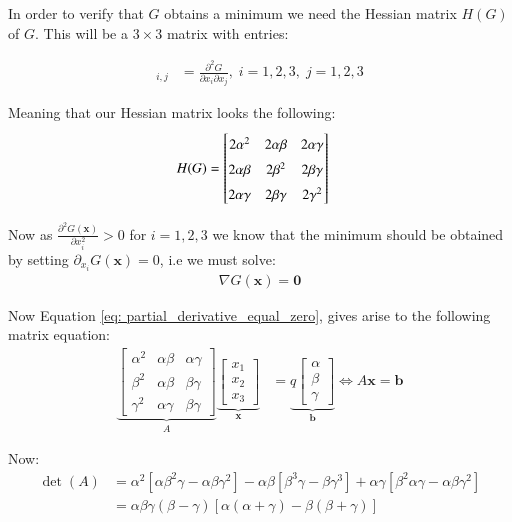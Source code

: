 In order to verify that $G$ obtains a minimum we need the Hessian matrix $H(G)$ of $G$. This will be a $3\times 3$ matrix with entries:  

\begin{align*}
[H(G)]_{i,j} &= 
\frac{
\partial^{2}G
}{
\partial x_{i}\partial x_{j}
}, \; i=1,2,3,\;j=1,2,3
\end{align*}

Meaning that our Hessian matrix looks the following:
\begin{align*}
H(G) &= 
\begingroup
\renewcommand*{\arraystretch}{1.5}
\begin{bmatrix}
2\alpha^{2} & 
2\alpha \beta & 
2\alpha \gamma \\ 
2\alpha \beta &
2\beta^{2} &
2\beta \gamma \\
2\alpha \gamma &
2\beta \gamma & 
2\gamma^{2}
\end{bmatrix}
\endgroup
\end{align*}


Now as $\frac{\partial^{2}G(\mathbf{x}) }{\partial x_{i}^{2}} > 0$ for $i=1,2,3$ we know that the minimum should be obtained by setting $\partial_{x_{i}}G(\mathbf{x}) = 0$, i.e we must solve: 
\begin{align}
\label{eq: partial_derivative_equal_zero}
\nabla G(\mathbf{x}) = \mathbf{0}    
\end{align}

Now Equation \ref{eq: partial_derivative_equal_zero}, gives arise to the following matrix equation: 
\begin{align*}
\underbrace{
\begin{bmatrix}
\alpha^{2} & \alpha\beta & \alpha\gamma \\ 
\beta^{2} & \alpha\beta & \beta\gamma \\ 
\gamma^{2} & \alpha\gamma & \beta\gamma
\end{bmatrix}
}_{A}
\underbrace{
\begin{bmatrix}
x_{1} \\ 
x_{2} \\ 
x_{3}
\end{bmatrix}
}_{\mathbf{x}}
&= 
\underbrace{
q 
\begin{bmatrix}
\alpha \\ 
\beta \\ 
\gamma 
\end{bmatrix}
}_{\mathbf{b}}
\iff  
A\mathbf{x} = \mathbf{b}
\end{align*}

Now: 
\begin{align*}
\det(A) &= 
\alpha^{2}\left[
\alpha\beta^{2}\gamma - \alpha\beta\gamma^{2}
\right]
- \alpha\beta\left[
\beta^{3}\gamma - \beta\gamma^{3}
\right]
+ \alpha\gamma\left[
\beta^{2}\alpha\gamma -\alpha\beta\gamma^{2}
\right] \\ 
&= 
\alpha\beta\gamma(\beta-\gamma)\left[
\alpha(\alpha+\gamma) -\beta(\beta + \gamma)
\right]
\end{align*}

